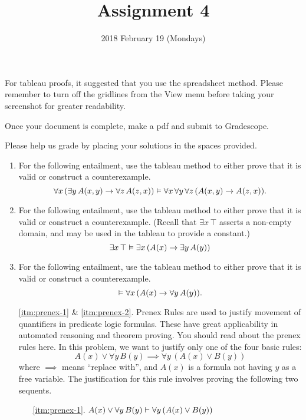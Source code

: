 \documentclass{cs81-homework}
\author{}
\title{Assignment 4}
\date{2018 February 19 (Mondays)}
\begin{document}
\begin{introduction}
  \theintroduction

  For tableau proofs, it suggested that you use the spreadsheet method. Please
  remember to turn off the gridlines from the View menu before taking your
  screenshot for greater readability.

  Once your document is complete, make a pdf and submit to Gradescope.

  Please help us grade by placing your solutions in the spaces provided.
\end{introduction}

\begin{enumerate}
\item {} For the following entailment, use the tableau method to either
  prove that it is valid or construct a counterexample.
  \[
    \forall x \, (\exists y \, A(x, y) \to \forall z \, A(z, x)) \vDash
    \forall x \, \forall y \, \forall z \, (A(x, y) \to A(z, x)).
  \]

  \begin{solution}
  \end{solution}

\item {} For the following entailment, use the tableau method to either
  prove that it is valid or construct a counterexample. (Recall that
  \(\exists x \, \top\) asserts a non-empty domain, and may be used in the
  tableau to provide a constant.)
  \[
    \exists x \, \top \vDash \exists x \, (A(x) \to \exists y \, A(y))
  \]

  \begin{solution}
  \end{solution}

\item {} For the following entailment, use the tableau method to either
  prove that it is valid or construct a counterexample.
  \[
    \vDash \forall x \, (A(x) \to \forall y \, A(y)).
  \]

  \begin{solution}
  \end{solution}

\item[\ref{itm:prenex-1} \& \ref{itm:prenex-2}.] Prenex Rules are used to
  justify movement of quantifiers in predicate logic formulas. These have great
  applicability in automated reasoning and theorem proving. You should read
  about the prenex rules here. In this problem, we want to justify only one of
  the four basic rules:
  \[
    A(x) \lor \forall y \, B(y) \implies \forall y \, (A(x) \lor B(y))
  \]
  where \(\implies\) means ``replace with'', and \(A(x)\) is a formula not
  having \(y\) as a free variable.  The justification for this rule involves
  proving the following two sequents.
    \begin{enumerate}
    \item[\ref{itm:prenex-1}.]
      \(A(x) \lor \forall y \, B(y) \vdash \forall y \, (A(x) \lor B(y))\)
      

\end{enumerate}
\end{enumerate}
\end{document}
